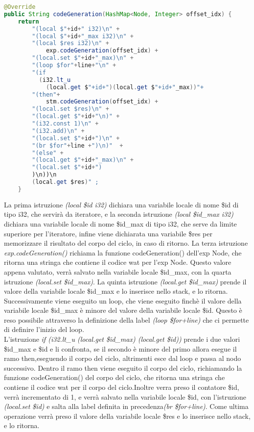 \documentclass[../../main.tex]{subfiles}
\begin{document}
\begin{lstlisting}[language=Java, caption={codeGeneration() per il for Node}, label={lst:codeGenerationFor}]
@Override
public String codeGeneration(HashMap<Node, Integer> offset_idx) {
    return  
        "(local $"+id+" i32)\n" +
        "(local $"+id+"_max i32)\n" +
        "(local $res i32)\n" +
            exp.codeGeneration(offset_idx) +
        "(local.set $"+id+"_max)\n" +   
        "(loop $for"+line+"\n" +       
        "(if 
          (i32.lt_u 
            (local.get $"+id+")(local.get $"+id+"_max))"+
        "(then"+
            stm.codeGeneration(offset_idx) +
        "(local.set $res)\n" +
        "(local.get $"+id+"\n)" +     
        "(i32.const 1)\n" +
        "(i32.add)\n" +    
        "(local.set $"+id+")\n" +
        "(br $for"+line +")\n)"  +
        "(else" +
        "(local.get $"+id+"_max)\n" + 
        "(local.set $"+id+")
        )\n))\n
        (local.get $res)" ;   
    }

\end{lstlisting}

La prima istruzione \textit{(local \$id i32)} dichiara una variabile locale di nome \$id di tipo i32, che servirà da iteratore, e la seconda istruzione \textit{(local \$id\_max i32)} dichiara una variabile locale di nome \$id\_max di tipo i32, che serve da limite superiore per l'iteratore, infine viene dichiarata una variabile \$res per memorizzare il risultato del corpo del ciclo, in caso di ritorno.
La terza istruzione \textit{exp.codeGeneration()} richiama la funzione codeGeneration() dell'exp Node, che ritorna una stringa che contiene il codice wat per l'exp Node.
Questo valore appena valutato, verrà salvato nella variabile locale \$id\_max, con la quarta istruzione \textit{(local.set \$id\_max)}.
La quinta istruzione \textit{(local.get \$id\_max)} prende il valore della variabile locale \$id\_max e lo inserisce nello stack, e lo ritorna.
Successivamente viene eseguito un loop, che viene eseguito finchè il valore della variabile locale \$id\_max è minore del valore della variabile locale \$id.
Questo è reso possibile attraverso la definizione della label \textit{(loop \$for+line)} che ci permette di definire l'inizio del loop.\\
L'istruzione \textit{if (i32.lt\_u (local.get \$id\_max) (local.get \$id))} prende i due valori \$id\_max e \$id e li confronta, se il secondo è minore del primo allora esegue il ramo then,eseguendo il corpo del ciclo, altrimenti esce dal loop e passa al nodo successivo.
Dentro il ramo then viene eseguito il corpo del ciclo, richiamando la funzione codeGeneration() del corpo del ciclo, che ritorna una stringa che contiene il codice wat per il corpo del ciclo.Inoltre verra preso il contatore \$id, verrà incrementato di 1, e verrà salvato nella variabile locale \$id, con l'istruzione \textit{(local.set \$id)} e salta alla label definita in precedenza\textit{(br \$for+line)}.
Come ultima operazione verrà preso il valore della variabile locale \$res e lo inserisce nello stack, e lo ritorna.
\end{document}
